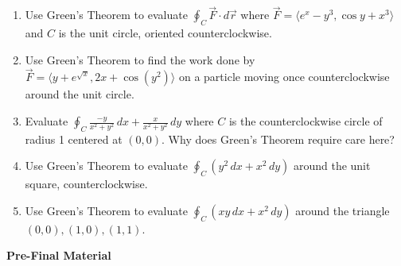 \documentclass[12pt]{article}
\newcounter{topic}
\newcommand{\examhead}[1]{\begin{center}{\large\textbf{#1}}\end{center}}
\begin{document}
\begin{enumerate}
\begin{enumerate}
\begin{center}
        \end{center}
        \item Use Green's Theorem to evaluate $\oint_C \vec{F} \cdot d\vec{r}$ where $\vec{F} = \langle e^x - y^3, \cos y + x^3 \rangle$ and $C$ is the unit circle, oriented counterclockwise.
        \item Use Green's Theorem to find the work done by $\vec{F} = \langle y + e^{\sqrt{x}}, 2x + \cos(y^2) \rangle$ on a particle moving once counterclockwise around the unit circle.
        \item Evaluate $\oint_C \frac{-y}{x^2+y^2} \, dx + \frac{x}{x^2+y^2} \, dy$ where $C$ is the counterclockwise circle of radius 1 centered at $(0,0)$. Why does Green's Theorem require care here?
        \item Use Green's Theorem to evaluate $\oint_C (y^2\,dx+x^2\,dy)$ around the unit square, counterclockwise.
        \item Use Green's Theorem to evaluate $\oint_C (xy\,dx+x^2\,dy)$ around the triangle $(0,0),(1,0),(1,1)$.
    \end{enumerate}
\newpage
\setcounter{topic}{\value{enumi}}
\end{enumerate}
\examhead{Pre-Final Material}
\end{document}

